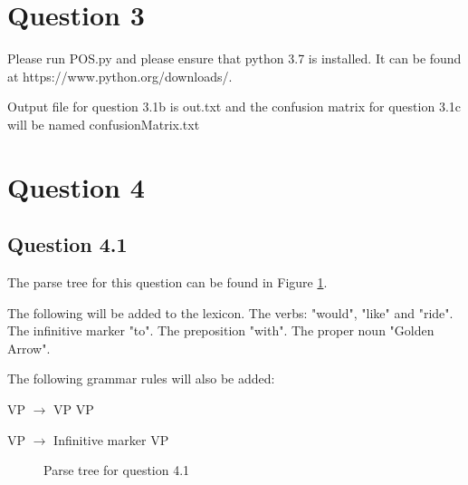 \documentclass[10pt,a4paper]{article}
\begin{document}
\section{Question 3}

Please run POS.py and please ensure that python 3.7 is installed. It can be
found at https://www.python.org/downloads/. 

Output file for question 3.1b is out.txt and the confusion matrix for question 3.1c will be named confusionMatrix.txt


\section{Question 4}
\subsection{Question 4.1}
The parse tree for this question can be found in Figure \ref{fig41}. 

The following will be added to the lexicon. The verbs: "would", "like" and "ride". The infinitive marker "to". The preposition "with". The proper noun "Golden Arrow".

The following grammar rules will also be added:

VP $\rightarrow$ VP VP

VP $\rightarrow$ Infinitive marker VP


\begin{figure}
\caption{Parse tree for question 4.1}
\label{fig41}
\end{figure}
\end{document}
